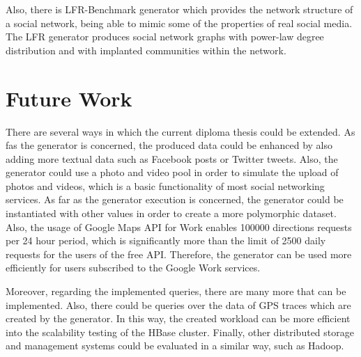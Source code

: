 Also, there is LFR-Benchmark generator \cite{27} which provides the network structure of a social network, being able to mimic some of the properties of real 
social media. The LFR generator produces social network graphs with power-law degree distribution and with implanted communities within the network.


\section{Future Work}

There are several ways in which the current diploma thesis could be extended. As fas the generator is concerned, the produced data could be enhanced by also adding more 
textual data such as Facebook posts or Twitter tweets. Also, the generator could use a photo and video pool in order to simulate the upload of photos and videos, 
which is a basic functionality of most social networking services. As far as the generator execution is concerned, the generator could be instantiated with other 
values in order to create a more polymorphic dataset. Also, the usage of Google Maps API for Work enables 100000 directions requests per 24 hour period, which is 
significantly more than the limit of 2500 daily requests for the users of the free API. Therefore, the generator can be used more efficiently for users 
subscribed to the Google Work services. 

Moreover, regarding the implemented queries, there are many more that can be implemented. Also, there could be queries over the data of GPS traces which are 
created by the generator. In this way, the created workload can be more efficient into the scalability testing of the HBase cluster. Finally, other 
distributed storage and management systems could be evaluated in a similar way, such as Hadoop. 
